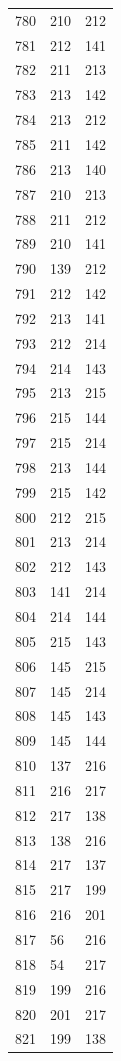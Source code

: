 \documentclass[a4paper,11pt]{article}
\begin{document}
\begin{center}
\begin{longtable}{|R{1.5cm}|R{1.5cm}|R{1.5cm}|}
  780 &  210 &  212 \\
  781 &  212 &  141 \\
  782 &  211 &  213 \\
  783 &  213 &  142 \\
  784 &  213 &  212 \\
  785 &  211 &  142 \\
  786 &  213 &  140 \\
  787 &  210 &  213 \\
  788 &  211 &  212 \\
  789 &  210 &  141 \\
  790 &  139 &  212 \\
  791 &  212 &  142 \\
  792 &  213 &  141 \\
  793 &  212 &  214 \\
  794 &  214 &  143 \\
  795 &  213 &  215 \\
  796 &  215 &  144 \\
  797 &  215 &  214 \\
  798 &  213 &  144 \\
  799 &  215 &  142 \\
  800 &  212 &  215 \\
  801 &  213 &  214 \\
  802 &  212 &  143 \\
  803 &  141 &  214 \\
  804 &  214 &  144 \\
  805 &  215 &  143 \\
  806 &  145 &  215 \\
  807 &  145 &  214 \\
  808 &  145 &  143 \\
  809 &  145 &  144 \\
  810 &  137 &  216 \\
  811 &  216 &  217 \\
  812 &  217 &  138 \\
  813 &  138 &  216 \\
  814 &  217 &  137 \\
  815 &  217 &  199 \\
  816 &  216 &  201 \\
  817 &   56 &  216 \\
  818 &   54 &  217 \\
  819 &  199 &  216 \\
  820 &  201 &  217 \\
  821 &  199 &  138 \\

\end{longtable}
\end{center}
\end{document}

